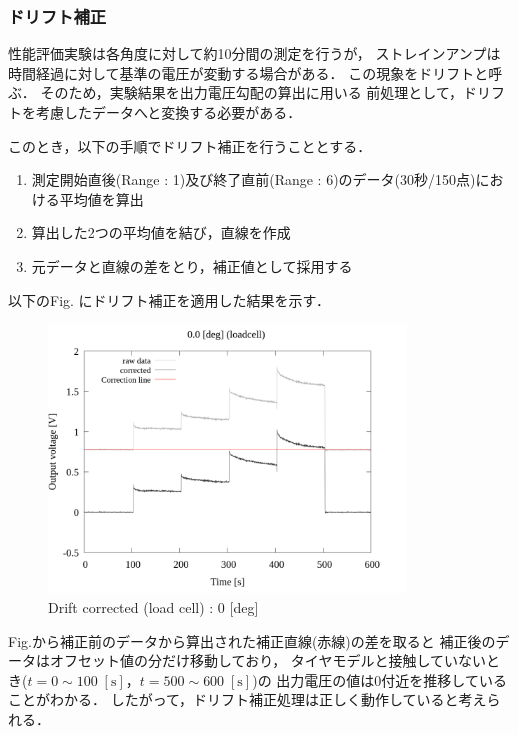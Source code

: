 \newpage

\subsubsection{ドリフト補正}
性能評価実験は各角度に対して約10分間の測定を行うが，
ストレインアンプは時間経過に対して基準の電圧が変動する場合がある．
この現象をドリフトと呼ぶ．
そのため，実験結果を出力電圧勾配の算出に用いる
前処理として，ドリフトを考慮したデータへと変換する必要がある．

このとき，以下の手順でドリフト補正を行うこととする．

\begin{enumerate}[(1)]
	\item 測定開始直後(Range : 1)及び終了直前(Range : 6)のデータ(30秒/150点)における平均値を算出
	\item 算出した2つの平均値を結び，直線を作成
	\item 元データと直線の差をとり，補正値として採用する
\end{enumerate}

以下のFig. にドリフト補正を適用した結果を示す．

\begin{figure}[htbp]
	\footnotesize
	\begin{center}
		\includegraphics[width=95mm]{../../02_workspace/result/2-1/plot/02-1_loadcell/02_loadcell-drift_0.png}
		\caption{Drift corrected (load cell) : 0 [deg]}
	\end{center}
\end{figure}

Fig.から補正前のデータから算出された補正直線(赤線)の差を取ると
補正後のデータはオフセット値の分だけ移動しており，
タイヤモデルと接触していないとき($t = 0 \sim 100 \; [\mathrm{s}]$，$t = 500 \sim 600 \; [\mathrm{s}]$)の
出力電圧の値は0付近を推移していることがわかる．
したがって，ドリフト補正処理は正しく動作していると考えられる．

